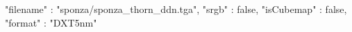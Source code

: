 { 
	"filename" : "sponza/sponza_thorn_ddn.tga", 
	"srgb" : false,
	"isCubemap" : false,
	"format" : "DXT5nm"
}